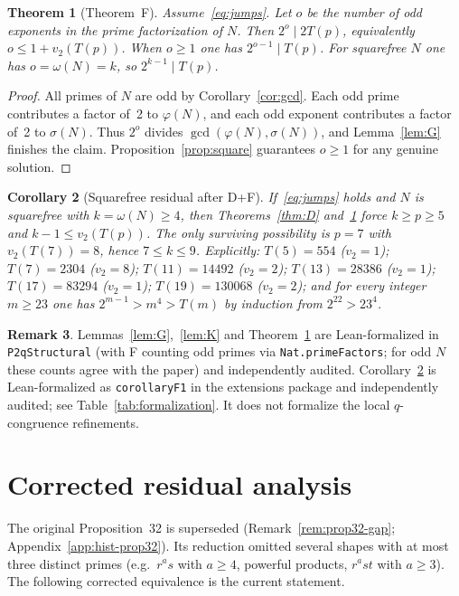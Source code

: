 \documentclass[11pt,reqno]{amsart}
\newcommand{\ph}{\varphi}
\newcommand{\sig}{\sigma}
\newtheorem{theorem}{Theorem}
\newtheorem{corollary}[theorem]{Corollary}
\theoremstyle{definition}
\newtheorem{remark}[theorem]{Remark}
\begin{document}
\begin{theorem}[Theorem~F]
\label{thm:F}
Assume~\eqref{eq:jumps}. Let \(o\) be the number of odd exponents in the prime factorization of \(N\). Then \(2^o\mid 2T(p)\), equivalently \(o\le 1+v_2(T(p))\). When \(o\ge 1\) one has \(2^{o-1}\mid T(p)\). For squarefree \(N\) one has \(o=\omega(N)=k\), so \(2^{k-1}\mid T(p)\).
\end{theorem}

\begin{proof}
All primes of \(N\) are odd by Corollary~\ref{cor:gcd}. Each odd prime contributes a factor of~2 to \(\ph(N)\), and each odd exponent contributes a factor of~2 to \(\sig(N)\). Thus \(2^o\) divides \(\gcd(\ph(N),\sig(N))\), and Lemma~\ref{lem:G} finishes the claim. Proposition~\ref{prop:square} guarantees \(o\ge 1\) for any genuine solution.
\end{proof}

\begin{corollary}[Squarefree residual after D+F]
\label{cor:F1}
If~\eqref{eq:jumps} holds and \(N\) is squarefree with \(k=\omega(N)\ge 4\), then Theorems~\ref{thm:D} and~\ref{thm:F} force \(k\ge p\ge 5\) and \(k-1\le v_2(T(p))\). The only surviving possibility is \(p=7\) with \(v_2(T(7))=8\), hence \(7\le k\le 9\). Explicitly: \(T(5)=554\) (\(v_2=1\)); \(T(7)=2304\) (\(v_2=8\)); \(T(11)=14492\) (\(v_2=2\)); \(T(13)=28386\) (\(v_2=1\)); \(T(17)=83294\) (\(v_2=1\)); \(T(19)=130068\) (\(v_2=2\)); and for every integer \(m\ge 23\) one has \(2^{m-1}>m^4>T(m)\) by induction from \(2^{22}>23^4\).
\end{corollary}

\begin{remark}
Lemmas~\ref{lem:G},~\ref{lem:K} and Theorem~\ref{thm:F} are Lean-formalized in \texttt{P2qStructural} (with F counting odd primes via \texttt{Nat.primeFactors}; for odd \(N\) these counts agree with the paper) and independently audited. Corollary~\ref{cor:F1} is Lean-formalized as \texttt{corollaryF1} in the extensions package and independently audited; see Table~\ref{tab:formalization}. It does not formalize the local \(q\)-congruence refinements.
\end{remark}

\section{Corrected residual analysis}
\label{sec:residual-corrected}

The original Proposition~32 is superseded (Remark~\ref{rem:prop32-gap}; Appendix~\ref{app:hist-prop32}). Its reduction omitted several shapes with at most three distinct primes (e.g.\ \(r^as\) with \(a\ge 4\), powerful products, \(r^ast\) with \(a\ge 3\)). The following corrected equivalence is the current statement.
\end{document}
